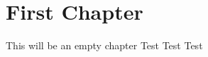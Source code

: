 \documentclass[
    12pt, %
    ngerman, %
    a4paper, %
    oneside, %
    parskip=half, %
    headings=normal, %
    listof=totoc, %
    bibliography=totoc, %
    index=totoc, %
    captions=tableheading, %
    final %
]{scrbook}
\begin{document}


\newpage
\setcounter{page}{1}
\pagestyle{fancy}
%
\chead{}
\rhead{\slshape \leftmark}
\lfoot{}
\cfoot{\thepage}
\rfoot{}

\tableofcontents
\setcounter{secnumdepth}{3}
\setcounter{tocdepth}{2}

\listoffigures %
\listoftables 



\chapter{First Chapter}
\setcounter{page}{1}

This will be an empty chapter
Test Test Test
\end{document}
